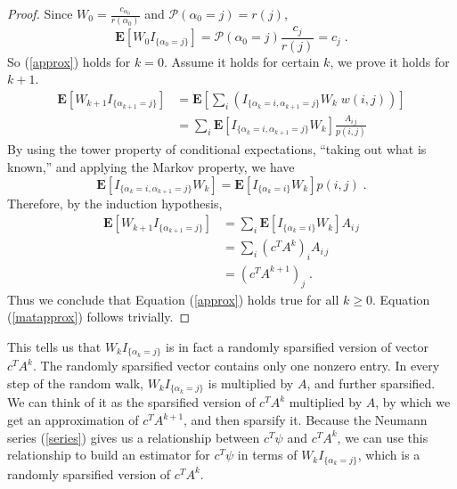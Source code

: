         \begin{proof}
            Since $W_0 = \frac{c_{\alpha_0}}{r(\alpha_0)}$ and
            $\mathcal{P}(\alpha_0 = j) = r(j)$,
            \[ \mathbf{E}[W_0 I_{\{\alpha_0 = j\}}]
                = \mathcal{P}(\alpha_0 = j) \frac{c_j}{r(j)} = c_j \;.
            \]
            So (\ref{approx}) holds for $k=0$.  Assume it holds for certain $k$,
            we prove it holds for $k+1$.
            \[ \begin{split}
                \mathbf{E}[W_{k+1} I_{\{\alpha_{k+1} = j\}}]
                &= \mathbf{E}\left[ \sum_i \left( I_{\{\alpha_k = i,
                    \alpha_{k+1} = j\}} W_k \; w(i,j) \right)\right] \\
                &= \sum_i \mathbf{E}\left[ I_{\{\alpha_k = i,
                    \alpha_{k+1} = j\}} W_k \right] \frac{A_{i\,j}}{p(i,j)}
            \end{split} \]
            By using the tower property of conditional expectations,
            ``taking out what is known,'' and applying the Markov property,
            we have
            \[ \mathbf{E}\left[ I_{\{\alpha_k = i,
                                     \alpha_{k+1} = j\}} W_k \right]
                = \mathbf{E}\left[ I_{\{\alpha_k = i\}} W_k \right] p(i,j) \;.
            \]
            Therefore, by the induction hypothesis,
            \[ \begin{split}
                \mathbf{E}[W_{k+1} I_{\{\alpha_{k+1} = j\}}]
                &= \sum_i \mathbf{E}\left[ I_{\{\alpha_k = i\}} W_k \right]
                          A_{i\,j} \\
                &= \sum_i  \left(c^T A^k\right)_i A_{i\,j} \\
                &= \left(c^T A^{k+1}\right)_j \;.
            \end{split} \]
            Thus we conclude that Equation (\ref{approx}) holds true for all
            $k\ge 0$. Equation (\ref{matapprox}) follows trivially.
        \end{proof}
        This tells us that $W_k I_{\{\alpha_k = j\}}$ is in fact a randomly
        sparsified version of vector $c^T A^k$.  The randomly sparsified
        vector contains only one nonzero entry.  In every step of the random
        walk, $W_k I_{\{\alpha_k = j\}}$ is multiplied by $A$, and further
        sparsified. We can think of it as the sparsified version of $c^T A^k$
        multiplied by $A$, by which we get an approximation of
        $c^T A^{k+1}$, and then sparsify it.  Because the Neumann series
        (\ref{series}) gives us a relationship between $c^T\psi$ and
        $c^T A^k$, we can use this relationship to build an estimator
        for $c^T \psi$ in terms of $W_k I_{\{\alpha_k = j\}}$, which is
        a randomly sparsified version of $c^T A^k$.
        
